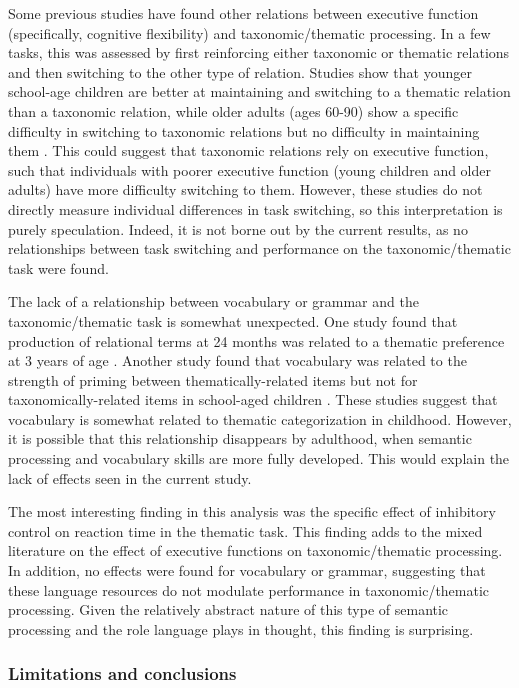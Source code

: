 \documentclass[../dissertation.tex]{subfiles}
\begin{document}
	Some previous studies have found other relations between executive function (specifically, cognitive flexibility) and taxonomic/thematic processing. In a few tasks, this was assessed by first reinforcing either taxonomic or thematic relations and then switching to the other type of relation. Studies show that younger school-age children are better at maintaining and switching to a thematic relation than a taxonomic relation, while older adults (ages 60-90) show a specific difficulty in switching to taxonomic relations but no difficulty in maintaining them \citep{Blaye2007, Maintenant2011}. This could suggest that taxonomic relations rely on executive function, such that individuals with poorer executive function (young children and older adults) have more difficulty switching to them. However, these studies do not directly measure individual differences in task switching, so this interpretation is purely speculation. Indeed, it is not borne out by the current results, as no relationships between task switching and performance on the taxonomic/thematic task were found. \par 
	The lack of a relationship between vocabulary or grammar and the taxonomic/thematic task is somewhat unexpected. One study found that production of relational terms at 24 months was related to a thematic preference at 3 years of age \citep{Dunham1995}. Another study found that vocabulary was related to the strength of priming between thematically-related items but not for taxonomically-related items in school-aged children \citep{Brooks2014}. These studies suggest that vocabulary is somewhat related to thematic categorization in childhood. However, it is possible that this relationship disappears by adulthood, when semantic processing and vocabulary skills are more fully developed. This would explain the lack of effects seen in the current study. \par
	The most interesting finding in this analysis was the specific effect of inhibitory control on reaction time in the thematic task. This finding adds to the mixed literature on the effect of executive functions on taxonomic/thematic processing. In addition, no effects were found for vocabulary or grammar, suggesting that these language resources do not modulate performance in taxonomic/thematic processing. Given the relatively abstract nature of this type of semantic processing and the role language plays in thought, this finding is surprising. 
	
\subsubsection{Limitations and conclusions}	
\end{document}
